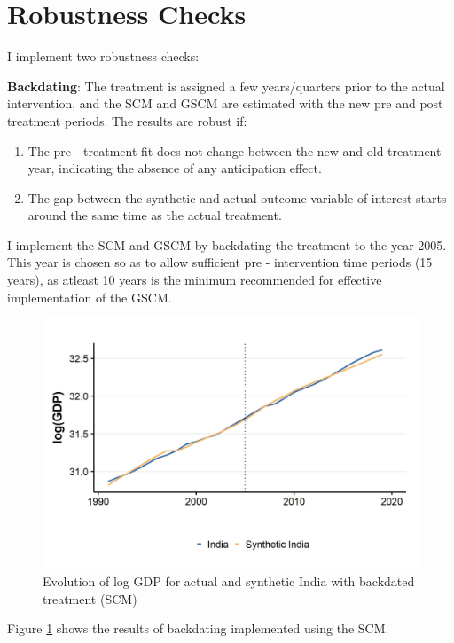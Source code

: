 \documentclass[12pt,nobind, a4paper]{reedthesis}
\begin{document}
 \hypertarget{robustness-checks}{%
 \section{Robustness Checks}\label{robustness-checks}}

 I implement two robustness checks:

 \textbf{Backdating}: The treatment is assigned a few years/quarters prior to the actual intervention, and the SCM and GSCM are estimated with the new pre and post treatment periods. The results are robust if:
 \begin{enumerate}
 \def\labelenumi{\alph{enumi}.}
 \item
   The pre - treatment fit does not change between the new and old treatment year, indicating the absence of any anticipation effect.
 \item
   The gap between the synthetic and actual outcome variable of interest starts around the same time as the actual treatment.
   \linebreak
 \end{enumerate}
 I implement the SCM and GSCM by backdating the treatment to the year 2005. This year is chosen so as to allow sufficient pre - intervention time periods (15 years), as atleast 10 years is the minimum recommended for effective implementation of the GSCM.

 \newpage
 \begin{figure}

 {\centering \includegraphics[width=1\linewidth]{figure/indiasynthbd} 

 }

 \caption{Evolution of log GDP for actual and synthetic India with backdated treatment (SCM)}\label{fig:scmbd}
 \end{figure}
 Figure \ref{fig:scmbd} shows the results of backdating implemented using the SCM.
\end{document}
